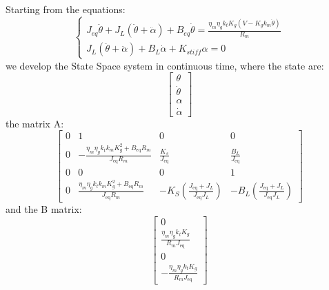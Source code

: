                 Starting from the equations:
                \begin{equation*}
                    \begin{cases}
                        J_{eq}\ddot\theta+J_{L}(\ddot\theta+\ddot\alpha) + B_{eq}\dot\theta=\frac{\eta_m\eta_g k_t K_g(V - K_g k_m\dot\theta)}{R_m} \\
                        J_{L}(\ddot\theta+\ddot\alpha)+B_L\dot\alpha +K_{stiff}\alpha=0
                    \end{cases}
                \end{equation*}
                we develop the State Space system in continuous time, where the state are:
                \[
                    \left\lbrack \begin{array}{c}
                        \theta \\
                        \dot{\theta} \\
                        \alpha \\
                        \dot{\alpha} 
                        \end{array}\right\rbrack\]
                the matrix A:
                \begin{equation*}
                    \left\lbrack \begin{array}{cccc}
                        0 & 1 & 0 & 0\\
                        0 & -\frac{\eta_m \eta_g k_t k_m K_g^2 +B_{\mathrm{eq}} R_m }{J_{\mathrm{eq}} R_m } & \frac{K_s }{J_{\mathrm{eq}} } & \frac{B_L }{J_{\mathrm{eq}} }\\
                        0 & 0 & 0 & 1\\
                        0 & \frac{\eta_m \eta_g k_t k_m K_g^2 +B_{\mathrm{eq}} R_m }{J_{\mathrm{eq}} R_m } & -K_S \left(\frac{J_{\mathrm{eq}} +J_{L} }{J_{\mathrm{eq}} J_{L} }\right) & -B_L \left(\frac{J_{\mathrm{eq}} +J_{L} }{J_{\mathrm{eq}} J_{L} }\right)
                        \end{array}\right\rbrack 
                \end{equation*}
                and the B matrix:
                \begin{equation*}
                    \left\lbrack \begin{array}{c}
                        0\\
                        \frac{\eta_m \eta_g k_t K_g }{R_m J_{\mathrm{eq}} }\\
                        0\\
                        -\frac{\eta_m \eta_g k_t K_g }{R_m J_{\mathrm{eq}} }
                        \end{array}\right\rbrack
                \end{equation*}


